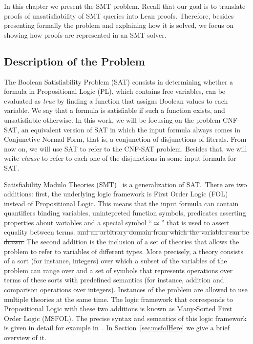 In this chapter we present the SMT problem. Recall that our goal is to translate proofs of unsatisfiability of SMT queries into Lean proofs. Therefore, besides presenting formally the problem and explaining how it is solved, we focus on showing how proofs are represented in an SMT solver.

\subsection{Description of the Problem}

The Boolean Satisfiability Problem (SAT) consists in determining whether a formula in Propositional Logic (PL), which contains free variables, can be evaluated as \textit{true} by finding a function that assigns Boolean values to each variable.
We say that a formula is satisfiable if such a function exists, and unsatisfiable otherwise. In
this work, we will be focusing on the problem CNF-SAT, an equivalent version of SAT in
which the input formula always comes in Conjunctive Normal Form, that is, a conjunction
of disjunctions of literals. From now on, we will use SAT to refer to the CNF-SAT problem. Besides
that, we will write \textit{clause} to refer to each one of the disjunctions in some
input formula for SAT.\


Satisfiability Modulo Theories (SMT)~\cite{smt} is a generalization of SAT.\
There are two additions: first, the underlying logic framework is First Order
Logic (FOL) instead of Propositional Logic. This means that the input formula
can contain quantifiers binding variables, unintepreted function symbols,
predicates asserting properties about variables and a special symbol ``$\simeq$'' that is used to assert equality between terms. \sout{and an arbitrary domain from which the variables can be drawn.} 
The second addition is the inclusion of a set of theories that
allows the problem to refer to variables of different types. More
precisely, a theory consists of a sort (for instance, integers) over which a
subset of the variables of the problem can range over and a set of symbols
that represents operations over terms of these sorts with predefined semantics (for
instance, addition and comparison operations over integers). Instances of the
problem are allowed to use multiple theories at the same time. The logic
framework that corresponds to Propositional Logic with these two additions is
known as Many-Sorted First Order Logic (MSFOL). The precise syntax and semantics of this logic framework
is given in detail for example in~\cite{many_sorted}. In
Section~\ref{sec:msfolHere} we give a brief overview of it.

